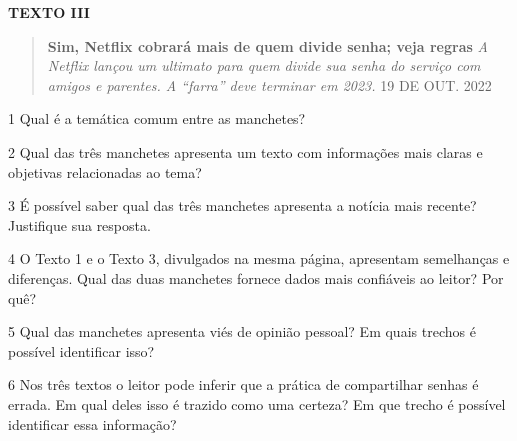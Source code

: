 \textbf{TEXTO III}

\begin{quote}
\textbf{Sim, Netflix cobrará mais de quem divide senha; veja regras}
\emph{A Netflix lançou um ultimato para quem divide sua senha do serviço
com amigos e parentes. A ``farra'' deve terminar em 2023.} 19 DE OUT.
2022
\end{quote}

\num{1} Qual é a temática comum entre as manchetes?



\num{2} Qual das três manchetes apresenta um texto com informações mais
claras e objetivas relacionadas ao tema?



\num{3} É possível saber qual das três manchetes apresenta a notícia
mais recente? Justifique sua resposta.



\num{4} O Texto 1 e o Texto 3, divulgados na mesma página, apresentam
semelhanças e diferenças. Qual das duas manchetes fornece dados mais
confiáveis ao leitor? Por quê?



\num{5} Qual das manchetes apresenta viés de opinião pessoal? Em quais
trechos é possível identificar isso?



\num{6} Nos três textos o leitor pode inferir que a prática de
compartilhar senhas é errada. Em qual deles isso é trazido como uma
certeza? Em que trecho é possível identificar essa informação?

